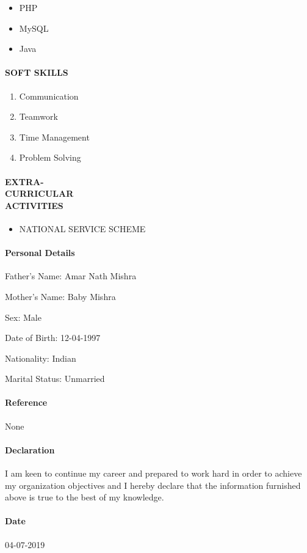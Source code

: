 \documentclass{article}
\begin{document}
\begin{itemize}
	\item PHP
	\item MySQL
	\item Java
\end{itemize}
\paragraph{\textbf{SOFT SKILLS }}

\begin{enumerate}
	\item Communication
	\item Teamwork
	\item Time Management
	\item Problem Solving
\end{enumerate}
\paragraph{\textbf{EXTRA-\\CURRICULAR\\ACTIVITIES }}

\begin{itemize}
	\item NATIONAL SERVICE SCHEME

\end{itemize}

\paragraph{\textbf{Personal Details}}
	\begin{description}
		\item Father's Name: Amar Nath Mishra
		\item Mother's Name: Baby Mishra
		\item Sex: Male
		\item Date of Birth: 12-04-1997
		\item Nationality: Indian
		\item Marital Status: Unmarried
	\end{description}
\paragraph{\textbf{Reference}}
None
\paragraph{\textbf{Declaration}}
I am keen to continue my career and prepared to work hard in order to achieve my organization objectives and I hereby declare that the information furnished above is true to the best of my knowledge.
\paragraph{\textbf{Date}}
04-07-2019
\end{document}
